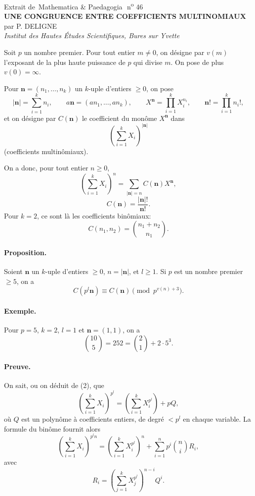 \documentclass[10pt]{article}
\newcommand{\og}{\guillemotleft\,}
\newcommand{\fg}{\,\guillemotright}
\newcommand{\nn}{\mathbf n}
\begin{document}
\begin{center}
{\large Extrait de \og Mathematica \& Paedagogia\fg\ n\textsuperscript{o} 46}\\[2.4em]
{\Large\bfseries UNE CONGRUENCE ENTRE COEFFICIENTS MULTINOMIAUX}\\[1.0em]
par P. DELIGNE\\
{\itshape Institut des Hautes Études Scientifiques, Bures sur Yvette}
\end{center}

\medskip

Soit $p$ un nombre premier. Pour tout entier $m\ne0$, on désigne par $v(m)$ l'exposant de la plus haute puissance de $p$ qui divise $m$. On pose de plus $v(0)=\infty$.

Pour $\nn=(n_1,\ldots,n_k)$ un $k$-uple d'entiers $\ge0$, on pose
\[
|\nn|=\sum_{i=1}^k n_i,\qquad
a\nn=(an_1,\ldots,an_k),\qquad
X^\nn=\prod_{i=1}^k X_i^{n_i},\qquad
\nn! = \prod_{i=1}^k n_i!,
\]
et on désigne par $C(\nn)$ le coefficient du monôme $X^\nn$ dans
\[
\left(\sum_{i=1}^k X_i\right)^{|\nn|}
\]
(coefficients multinômiaux).

On a donc, pour tout entier $n\ge0$,
\[
\left(\sum_{i=1}^k X_i\right)^n
=\sum_{|\nn|=n} C(\nn)X^\nn, \tag{1}
\]
\[
C(\nn)=\frac{|\nn|!}{\nn!}. \tag{2}
\]
Pour $k=2$, ce sont là les coefficients binômiaux:
\[
C(n_1,n_2)=\binom{n_1+n_2}{n_1}. \tag{3}
\]

\paragraph{Proposition.} Soient $\nn$ un $k$-uple d'entiers $\ge0$, $n=|\nn|$, et $l\ge1$. Si $p$ est un nombre premier $\ge5$, on a
\[
C(p^l\nn)\equiv C(\nn)\pmod {p^{v(n)+3}}. \tag{4}
\]

\paragraph{Exemple.} Pour $p=5$, $k=2$, $l=1$ et $\nn=(1,1)$, on a
\[
\binom{10}{5}=252=\binom21+2\cdot5^3.
\]

\paragraph{Preuve.} On sait, ou on déduit de (2), que
\[
\left(\sum_{i=1}^k X_i\right)^{p^l}
=
\left(\sum_{i=1}^k X_i^{p^l}\right)+pQ, \tag{5}
\]
où $Q$ est un polynôme à coefficients entiers, de degré $<p^l$ en chaque variable. La formule du binôme fournit alors
\[
\left(\sum_{i=1}^k X_i\right)^{p^l n}
=
\left(\sum_{i=1}^k X_i^{p^l}\right)^n
+\sum_{i=1}^n p^i\binom ni R_i, \tag{6}
\]
avec
\[
R_i=
\left(\sum_{j=1}^k X_j^{p^l}\right)^{n-i}Q^i. \tag{7}
\]
\end{document}
